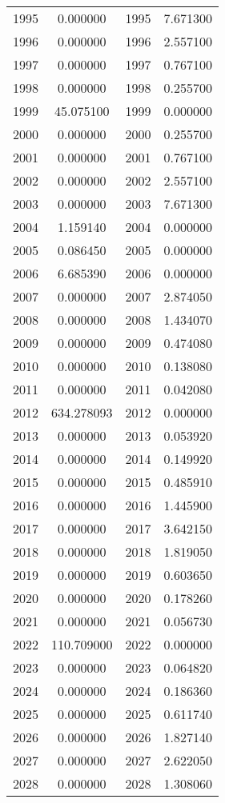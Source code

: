 \documentclass[12pt]{article}
\begin{document}
\begin{longtable}{@{}cccc@{}}
1995 & 0.000000 & 1995 & 7.671300 \\
1996 & 0.000000 & 1996 & 2.557100 \\
1997 & 0.000000 & 1997 & 0.767100 \\
1998 & 0.000000 & 1998 & 0.255700 \\
1999 & 45.075100 & 1999 & 0.000000 \\
2000 & 0.000000 & 2000 & 0.255700 \\
2001 & 0.000000 & 2001 & 0.767100 \\
2002 & 0.000000 & 2002 & 2.557100 \\
2003 & 0.000000 & 2003 & 7.671300 \\
2004 & 1.159140 & 2004 & 0.000000 \\
2005 & 0.086450 & 2005 & 0.000000 \\
2006 & 6.685390 & 2006 & 0.000000 \\
2007 & 0.000000 & 2007 & 2.874050 \\
2008 & 0.000000 & 2008 & 1.434070 \\
2009 & 0.000000 & 2009 & 0.474080 \\
2010 & 0.000000 & 2010 & 0.138080 \\
2011 & 0.000000 & 2011 & 0.042080 \\
2012 & 634.278093 & 2012 & 0.000000 \\
2013 & 0.000000 & 2013 & 0.053920 \\
2014 & 0.000000 & 2014 & 0.149920 \\
2015 & 0.000000 & 2015 & 0.485910 \\
2016 & 0.000000 & 2016 & 1.445900 \\
2017 & 0.000000 & 2017 & 3.642150 \\
2018 & 0.000000 & 2018 & 1.819050 \\
2019 & 0.000000 & 2019 & 0.603650 \\
2020 & 0.000000 & 2020 & 0.178260 \\
2021 & 0.000000 & 2021 & 0.056730 \\
2022 & 110.709000 & 2022 & 0.000000 \\
2023 & 0.000000 & 2023 & 0.064820 \\
2024 & 0.000000 & 2024 & 0.186360 \\
2025 & 0.000000 & 2025 & 0.611740 \\
2026 & 0.000000 & 2026 & 1.827140 \\
2027 & 0.000000 & 2027 & 2.622050 \\
2028 & 0.000000 & 2028 & 1.308060 \\

\end{longtable}
\end{document}
